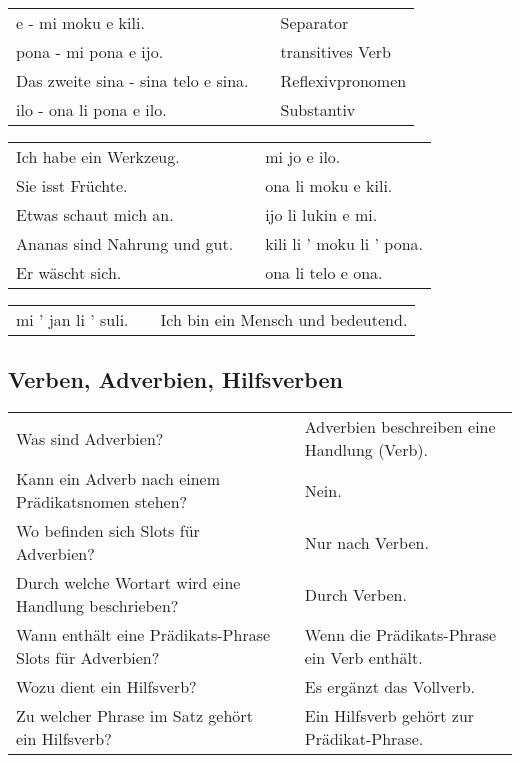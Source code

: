 \begin{supertabular}{p{5,5cm}|ll}
e - mi moku e kili. && Separator \\ %
pona - mi pona e ijo. && transitives Verb \\ %
Das zweite sina - sina telo e sina. &&  Reflexivpronomen  \\ %
ilo - ona li pona e ilo. && Substantiv \\ %
\end{supertabular}

\begin{supertabular}{p{5,5cm}|ll}
Ich habe ein Werkzeug. && mi jo e ilo. \\ %
Sie isst Früchte.  && ona li moku e kili. \\ %
Etwas schaut mich an. && ijo li lukin e mi. \\ %
Ananas sind Nahrung und gut. && kili li ' moku li ' pona. \\ %
Er wäscht sich. && ona li telo e ona.  \\ %
\end{supertabular}  

\begin{supertabular}{p{5,5cm}|ll}
mi ' jan li ' suli. && Ich bin ein Mensch und bedeutend. \\
\end{supertabular} 


\newpage
%
\subsection*{Verben, Adverbien, Hilfsverben} 
\label{'adverbs'}

\begin{supertabular}{p{5,5cm}|ll}
Was sind Adverbien? && Adverbien beschreiben eine Handlung (Verb). \\ %
Kann ein Adverb nach einem Prädikatsnomen stehen? && Nein.  \\ %
Wo befinden sich Slots für Adverbien? 	&&  Nur nach Verben. \\ %
Durch welche Wortart wird eine Handlung beschrieben? && Durch Verben. \\ %
Wann enthält eine Prädikats-Phrase Slots für Adverbien? && Wenn die Prädikats-Phrase ein Verb enthält. \\ %
Wozu dient ein Hilfsverb? && Es ergänzt das Vollverb.  \\ %
Zu welcher Phrase im Satz gehört ein Hilfsverb? && Ein Hilfsverb gehört zur Prädikat-Phrase.  \\ %
\end{supertabular} 

